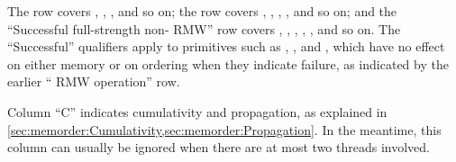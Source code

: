 The  row covers ,
, , and so on; the 
row covers , ,
, , and so on; and
the ``Successful full-strength non- RMW'' row covers
, , ,
, , and so on.
The ``Successful'' qualifiers apply to primitives such as
, , and ,
which have no effect on either memory or on ordering when they indicate
failure, as indicated by the earlier `` RMW operation'' row.

Column ``C'' indicates cumulativity and propagation, as explained in
\cref{sec:memorder:Cumulativity,sec:memorder:Propagation}.
In the meantime, this column can usually be ignored when there
are at most two threads involved.

